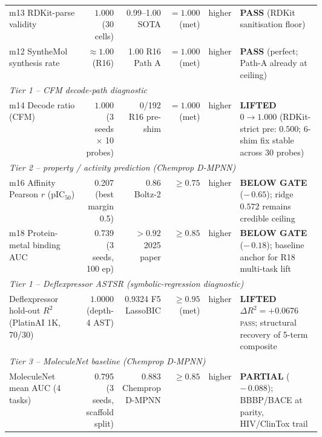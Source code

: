 \begin{table}[ht]
\begin{tabular}{p{0.30\linewidth} r r r c p{0.30\linewidth}}
m13 RDKit-parse validity               & $1.000$ \MEASURED{} (30 cells)     & 0.99--1.00 SOTA \CITEDONLY{}    & $= 1.000$ (met) \PROJECTED{} & higher & \textbf{PASS} (RDKit sanitisation floor) \\
m12 SyntheMol synthesis rate           & $\approx 1.00$ \MEASURED{} (R16)    & 1.00 R16 Path A \MEASURED{}    & $= 1.000$ (met) \PROJECTED{} & higher & \textbf{PASS} (perfect; Path-A already at ceiling) \\
\midrule
\multicolumn{6}{l}{\textit{Tier 1 -- CFM decode-path diagnostic}} \\
m14 Decode ratio (CFM)                 & $\mathbf{1.000}$ \MEASURED{} (3 seeds $\times$ 10 probes) & 0/192 R16 pre-shim \MEASURED{} & $= 1.000$ (met) \PROJECTED{} & higher & \textbf{LIFTED} $0\!\to\!1.000$ (RDKit-strict pre: $0.500$; 6-shim fix stable across 30 probes) \\
\midrule
\multicolumn{6}{l}{\textit{Tier 2 -- property / activity prediction (Chemprop D-MPNN)}} \\
m16 Affinity Pearson $r$ (pIC$_{50}$)  & 0.207 \MEASURED{} (best margin 0.5) & 0.86 Boltz-2 \CITEDONLY{}       & $\geq 0.75$ \PROJECTED{} & higher & \textbf{BELOW GATE} ($-\,0.65$); ridge $0.572$ remains credible ceiling \\
m18 Protein-metal binding AUC          & 0.739 \MEASURED{} (3 seeds, 100 ep) & $> 0.92$ 2025 paper \CITEDONLY{} & $\geq 0.85$ \PROJECTED{} & higher & \textbf{BELOW GATE} ($-\,0.18$); baseline anchor for R18 multi-task lift \\
\midrule
\multicolumn{6}{l}{\textit{Tier 1 -- Deflexpressor ASTSR (symbolic-regression diagnostic)}} \\
Deflexpressor hold-out $R^2$ (PlatinAI 1K, 70/30) & $\mathbf{1.0000}$ \MEASURED{} (depth-4 AST) & 0.9324 F5 LassoBIC \MEASURED{} & $\geq 0.95$ (met) \PROJECTED{} & higher & \textbf{LIFTED} $\Delta R^2 = +0.0676$ \textsc{pass}; structural recovery of 5-term composite \\
\midrule
\multicolumn{6}{l}{\textit{Tier 3 -- MoleculeNet baseline (Chemprop D-MPNN)}} \\
MoleculeNet mean AUC (4 tasks)        & 0.795 \MEASURED{} (3 seeds, scaffold split) & 0.883 Chemprop D-MPNN \CITEDONLY{} & $\geq 0.85$ \PROJECTED{} & higher & \textbf{PARTIAL} ($-\,0.088$); BBBP/BACE at parity, HIV/ClinTox trail \\
\bottomrule
\end{tabular}

\end{table}
